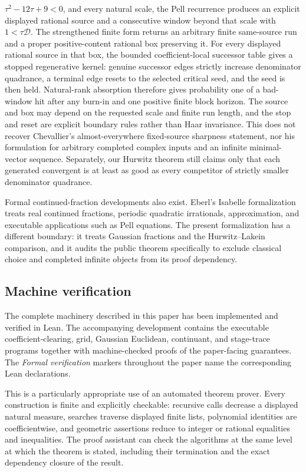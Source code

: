 \documentclass[11pt]{article}
\begin{document}
$\tau^2-12\tau+9<0$, and every natural scale, the Pell recurrence produces
an explicit displayed rational source and a consecutive window beyond that scale with
$1<\tau\mathcal D$.  The strengthened finite form returns an arbitrary
finite same-source run and a proper positive-content rational box preserving
it.  For every displayed rational source in that box, the bounded
coefficient-local successor table gives a stopped regenerative kernel:
genuine successor edges strictly increase denominator quadrance, a terminal
edge resets to the selected critical seed, and the seed is then held.
Natural-rank absorption therefore gives probability one of a bad-window hit
after any burn-in and one positive finite block horizon.  The source and box
may depend on the requested scale and finite run length, and the stop and
reset are explicit boundary rules rather than Haar invariance.  This does not
recover Chevallier's almost-everywhere fixed-source sharpness statement, nor
his formulation for arbitrary completed complex inputs and an infinite
minimal-vector sequence.
Separately,
our Hurwitz theorem
still claims only that each generated convergent is at least as good as every
competitor of strictly smaller denominator quadrance.

Formal continued-fraction developments also exist.  Eberl's Isabelle
formalization~\cite{EberlContinuedFractions} treats real continued fractions,
periodic quadratic irrationals, approximation, and executable applications
such as Pell equations.  The present formalization has a different boundary:
it treats Gaussian fractions and the Hurwitz--Lakein comparison, and it audits
the public theorem specifically to exclude classical choice and completed
infinite objects from its proof dependency.

\subsection{Machine verification}
\label{sec:machine-verification}

The complete machinery described in this paper has been implemented and
verified in Lean.  The accompanying development contains the executable
coefficient-clearing, grid, Gaussian Euclidean, continuant, and stage-trace
programs together with machine-checked proofs of the paper-facing guarantees.
The \emph{Formal verification} markers throughout the paper name the
corresponding Lean declarations.

This is a particularly appropriate use of an automated theorem prover.
Every construction is finite and explicitly checkable: recursive calls
decrease a displayed natural measure, searches traverse displayed finite
lists, polynomial identities are coefficientwise, and geometric assertions
reduce to integer or rational equalities and inequalities.  The proof
assistant can check the algorithms at the same level at which the theorem is
stated, including their termination and the exact dependency closure of the
result.
\end{document}
